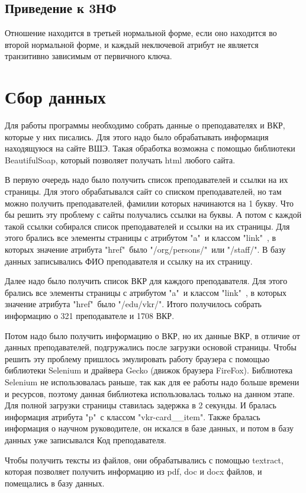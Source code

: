 \documentclass[PI,KR]{HSEUniversity}
\begin{document}
\subsection{Приведение к 3НФ}
Отношение находится в третьей нормальной форме, если оно находится во второй нормальной форме, и каждый неключевой атрибут не является транзитивно зависимым от первичного ключа.
\section{Сбор данных}
Для работы программы необходимо собрать данные о преподавателях и ВКР, которые у них писались. Для этого надо было обрабатывать информация находящуюся на сайте ВШЭ. Такая обработка возможна с помощью библиотеки BeautifulSoap, который позволяет получать html любого сайта.

В первую очередь надо было получить список преподавателей и ссылки на их страницы. Для этого обрабатывался сайт со списком преподавателей, но там можно получить преподавателей, фамилии которых начинаются на 1 букву. Что бы решить эту проблему с сайты получались ссылки на буквы. А потом с каждой такой ссылки собирался список преподавателей и ссылки на их страницы. Для этого брались все элементы страницы с атрибутом "a"\ и классом "link"\ , в которых значение атрибута "href"\ было "/org/persons/"\ или "/staff/". В базу данных записывались ФИО преподавателя и ссылку на их страницу. 

Далее надо было получить список ВКР для каждого преподавателя. Для этого брались все элементы страницы с атрибутом "a"\ и классом "link"\ , в которых значение атрибута "href"\ было "/edu/vkr/". Итого получилось собрать информацию о 321 преподавателе и 1708 ВКР.

Потом надо было получить информацию о ВКР, но их данные ВКР, в отличие от данных преподавателей, подгружались после загрузки основой страницы. Чтобы решить эту проблему пришлось эмулировать работу браузера с помощью библиотеки Selenium и драйвера Gecko (движок браузера FireFox). Библиотека Selenium не использовалась раньше, так как для ее работы надо больше времени и ресурсов, поэтому данная библиотека использовалась только на данном этапе. Для полной загрузки страницы ставилась задержка в 2 секунды. И бралась информация атрибута "p"\ с классом "vkr-card\_\_item". Также бралась информация о научном руководителе, он искался в базе данных, и потом в базу данных уже записывался Код преподавателя.

Чтобы получить тексты из файлов, они обрабатывались с помощью textract, которая позволяет получить информацию из pdf, doc и docx файлов, и помещались в базу данных.
\end{document}
